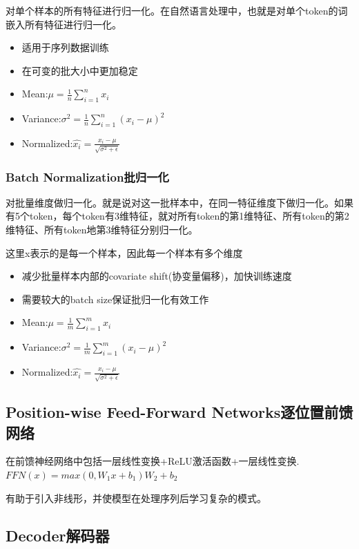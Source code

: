 \documentclass[UTF8]{ctexart}
\begin{document}
对单个样本的所有特征进行归一化。在自然语言处理中，也就是对单个token的词嵌入所有特征进行归一化。

\begin{itemize}
    \item 适用于序列数据训练
    \item 在可变的批大小中更加稳定
    \item Mean:$\mu=\frac{1}{n}\sum\limits_{i=1}^{n}x_{i}$
    \item Variance:$\sigma^{2}=\frac{1}{n}\sum\limits_{i=1}^{n}(x_{i}-\mu)^{2}$
    \item Normalized:$\hat{x_{i}}=\frac{x_{i}-\mu}{\sqrt{\sigma^{2}+\epsilon}} $
\end{itemize}

\subsubsection{Batch Normalization批归一化}

对批量维度做归一化。就是说对这一批样本中，在同一特征维度下做归一化。如果有5个token，每个token有3维特征，就对所有token的第1维特征、所有token的第2维特征、所有token地第3维特征分别归一化。

这里x表示的是每一个样本，因此每一个样本有多个维度
\begin{itemize}
    \item 减少批量样本内部的covariate shift(协变量偏移)，加快训练速度
    \item 需要较大的batch size保证批归一化有效工作
    \item Mean:$\mu=\frac{1}{m}\sum\limits_{i=1}^{m}x_{i}$
    \item Variance:$\sigma^{2}=\frac{1}{m}\sum\limits_{i=1}^{m}(x_{i}-\mu)^{2}$
    \item Normalized:$\hat{x_{i}}=\frac{x_{i}-\mu}{\sqrt{\sigma^{2}+\epsilon}} $
\end{itemize}

\subsection{Position-wise Feed-Forward Networks逐位置前馈网络}
在前馈神经网络中包括一层线性变换+ReLU激活函数+一层线性变换.$FFN(x)=max(0,W_{1}x+b_{1})W_{2}+b_{2}$

有助于引入非线形，并使模型在处理序列后学习复杂的模式。

\subsection{Decoder解码器}
\end{document}
